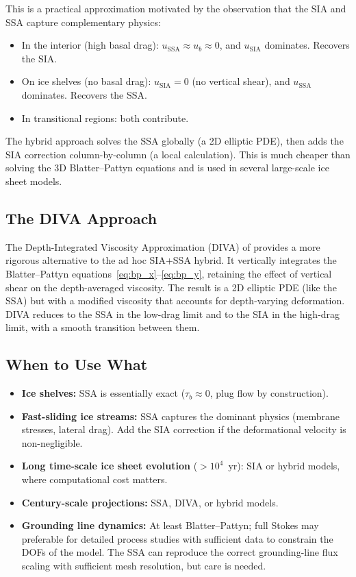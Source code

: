 \documentclass[11pt]{article}
\begin{document}
\medskip
\noindent This is a practical approximation motivated by the observation that the SIA and SSA capture complementary physics:
\begin{itemize}[nosep]
  \item In the interior (high basal drag): $u_{\text{SSA}} \approx u_b \approx 0$, and $u_{\text{SIA}}$ dominates.  Recovers the SIA.
  \item On ice shelves (no basal drag): $u_{\text{SIA}} = 0$ (no vertical shear), and $u_{\text{SSA}}$ dominates.  Recovers the SSA.
  \item In transitional regions: both contribute.
\end{itemize}

\noindent The hybrid approach solves the SSA globally (a 2D elliptic PDE), then adds the SIA correction column-by-column (a local calculation).  This is much cheaper than solving the 3D Blatter--Pattyn equations and is used in several large-scale ice sheet models.

\subsection{The DIVA Approach}

The Depth-Integrated Viscosity Approximation (DIVA) of \cite{SchoofHindmarsh2010} provides a more rigorous alternative to the ad hoc SIA+SSA hybrid.  It vertically integrates the Blatter--Pattyn equations~\eqref{eq:bp_x}--\eqref{eq:bp_y}, retaining the effect of vertical shear on the depth-averaged viscosity.  The result is a 2D elliptic PDE (like the SSA) but with a modified viscosity that accounts for depth-varying deformation.  DIVA reduces to the SSA in the low-drag limit and to the SIA in the high-drag limit, with a smooth transition between them.

\subsection{When to Use What}

\begin{itemize}
  \item \textbf{Ice shelves:} SSA is essentially exact ($\tau_b \approx 0$, plug flow by construction).
  \item \textbf{Fast-sliding ice streams:} SSA captures the dominant physics (membrane stresses, lateral drag).  Add the SIA correction if the deformational velocity is non-negligible.
  \item \textbf{Long time-scale ice sheet evolution} ($>10^4$~yr): SIA or hybrid models, where computational cost matters.
  \item \textbf{Century-scale projections:} SSA, DIVA, or hybrid models.
  \item \textbf{Grounding line dynamics:} At least Blatter--Pattyn; full Stokes may preferable for detailed process studies with sufficient data to constrain the DOFs of the model.  The SSA can reproduce the correct grounding-line flux scaling with sufficient mesh resolution, but care is needed.
\end{itemize}
\end{document}
